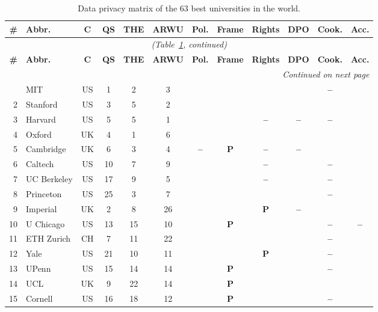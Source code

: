 \documentclass[pdflatex,sn-basic,Numbered]{sn-jnl}
\newcommand{\si}{\ding{51}}
\newcommand{\no}{\textcolor{gris}{\textbf{--}}}
\newcommand{\pc}{\textbf{P}}
\theoremstyle{thmstyleone}
\theoremstyle{thmstyletwo}
\theoremstyle{thmstylethree}
\begin{document}
\begin{appendices}
\footnotesize
\begin{longtable}{@{}r l c c c c c c c c c c@{}}
	\caption{Data privacy matrix of the 63 best universities in the world.}\label{tab:mundo}\\
	\toprule
	\textbf{\#} & \textbf{Abbr.} & \textbf{C} & \textbf{QS} & \textbf{THE} & \textbf{ARWU} & \textbf{Pol.} & \textbf{Frame} & \textbf{Rights} & \textbf{DPO} & \textbf{Cook.} & \textbf{Acc.} \\
	\midrule
	\endfirsthead
	\multicolumn{12}{c}{\textit{(Table~\ref{tab:mundo}, continued)}}\\
	\toprule
	\textbf{\#} & \textbf{Abbr.} & \textbf{C} & \textbf{QS} & \textbf{THE} & \textbf{ARWU} & \textbf{Pol.} & \textbf{Frame} & \textbf{Rights} & \textbf{DPO} & \textbf{Cook.} & \textbf{Acc.} \\
	\midrule
	\endhead
	\midrule
	\multicolumn{12}{r}{\textit{Continued on next page}}\\
	\endfoot
	\bottomrule
	\endlastfoot
1 & MIT & US & 1 & 2 & 3 & \si & \si & \si & \si & \no & \si \\
	2 & Stanford & US & 3 & 5 & 2 & \si & \si & \si & \si & \si & \si \\
	3 & Harvard & US & 5 & 5 & 1 & \si & \si & \no & \no & \no & \si \\
	4 & Oxford & UK & 4 & 1 & 6 & \si & \si & \si & \si & \si & \si \\
	5 & Cambridge & UK & 6 & 3 & 4 & \no & \pc & \no & \no & \si & \si \\
	6 & Caltech & US & 10 & 7 & 9 & \si & \si & \no & \si & \no & \si \\
	7 & UC Berkeley & US & 17 & 9 & 5 & \si & \si & \no & \si & \no & \si \\
	8 & Princeton & US & 25 & 3 & 7 & \si & \si & \si & \si & \no & \si \\
	9 & Imperial & UK & 2 & 8 & 26 & \si & \si & \pc & \no & \si & \si \\
	10 & U Chicago & US & 13 & 15 & 10 & \si & \pc & \si & \si & \no & \no \\
	11 & ETH Zurich & CH & 7 & 11 & 22 & \si & \si & \si & \si & \no & \si \\
	12 & Yale & US & 21 & 10 & 11 & \si & \si & \pc & \si & \no & \si \\
	13 & UPenn & US & 15 & 14 & 14 & \si & \pc & \si & \si & \no & \si \\
	14 & UCL & UK & 9 & 22 & 14 & \si & \pc & \si & \si & \si & \si \\
	15 & Cornell & US & 16 & 18 & 12 & \si & \pc & \si & \si & \no & \si \\

\end{longtable}
\end{appendices}
\end{document}
